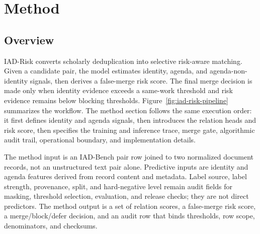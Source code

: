 \documentclass[11pt]{article}
\begin{document}
\section{Method}

\subsection{Overview}

IAD-Risk converts scholarly deduplication into selective risk-aware matching. Given a candidate pair, the model estimates identity, agenda, and agenda-non-identity signals, then derives a false-merge risk score. The final merge decision is made only when identity evidence exceeds a same-work threshold and risk evidence remains below blocking thresholds. Figure~\ref{fig:iad-risk-pipeline} summarizes the workflow. The method section follows the same execution order: it first defines identity and agenda signals, then introduces the relation heads and risk score, then specifies the training and inference trace, merge gate, algorithmic audit trail, operational boundary, and implementation details.

The method input is an IAD-Bench pair row joined to two normalized document records, not an unstructured text pair alone. Predictive inputs are identity and agenda features derived from record content and metadata. Label source, label strength, provenance, split, and hard-negative level remain audit fields for masking, threshold selection, evaluation, and release checks; they are not direct predictors. The method output is a set of relation scores, a false-merge risk score, a merge/block/defer decision, and an audit row that binds thresholds, row scope, denominators, and checksums.
\end{document}
